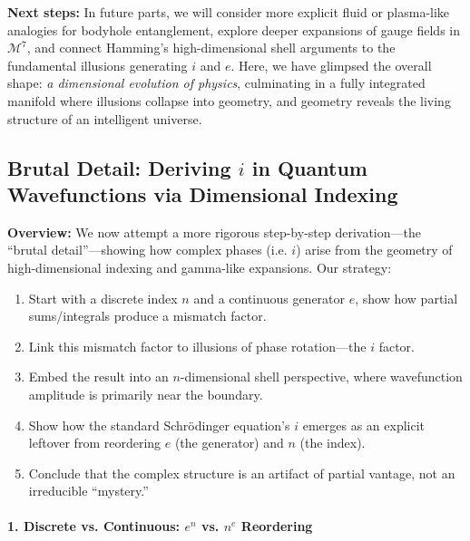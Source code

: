 \documentclass{article}
\begin{document}
\noindent \textbf{Next steps:} In future parts, we will consider more explicit fluid or plasma-like analogies for bodyhole entanglement, explore deeper expansions of gauge fields in $\mathcal{M}^7$, and connect Hamming’s high-dimensional shell arguments to the fundamental illusions generating $i$ and $e$. Here, we have glimpsed the overall shape: \emph{a dimensional evolution of physics}, culminating in a fully integrated manifold where illusions collapse into geometry, and geometry reveals the living structure of an intelligent universe.






\subsection*{Brutal Detail: Deriving $i$ in Quantum Wavefunctions via Dimensional Indexing}

\noindent\textbf{Overview:}
We now attempt a more rigorous step-by-step derivation---the “brutal detail”---showing how complex phases (i.e. $i$) arise from the geometry of high-dimensional indexing and gamma-like expansions. Our strategy:
\begin{enumerate}
\item Start with a discrete index $n$ and a continuous generator $e$, show how partial sums/integrals produce a mismatch factor.\vspace{-6pt}
\item Link this mismatch factor to illusions of phase rotation---the $i$ factor.\vspace{-6pt}
\item Embed the result into an $n$-dimensional shell perspective, where wavefunction amplitude is primarily near the boundary.\vspace{-6pt}
\item Show how the standard Schr\"odinger equation’s $i$ emerges as an explicit leftover from reordering $e$ (the generator) and $n$ (the index).\vspace{-6pt}
\item Conclude that the complex structure is an artifact of partial vantage, not an irreducible “mystery.”
\end{enumerate}

\paragraph{1. Discrete vs. Continuous: $e^n$ vs. $n^e$ Reordering}
\end{document}
